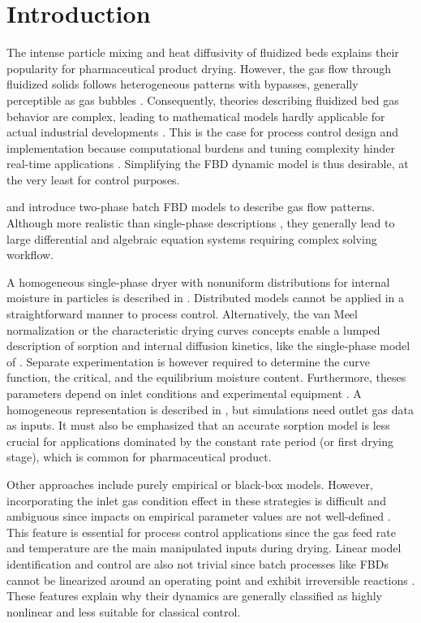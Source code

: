 \section{Introduction}

The intense particle mixing and heat diffusivity of fluidized beds explains their popularity for pharmaceutical product drying. However, the gas flow through fluidized solids follows heterogeneous patterns with bypasses, generally perceptible as gas bubbles \citep{handbookFluidization}. Consequently, theories describing fluidized bed gas behavior are complex, leading to mathematical models hardly applicable for actual industrial developments \citep{reviewModelPhilippsen}. This is the case for process control design and implementation because computational burdens and tuning complexity hinder real-time applications \citep[e.g.][]{nmpcFBD}. Simplifying the \gls{FBD} dynamic model is thus desirable, at the very least for control purposes.

\citet{batchTsotas} and \citet{fbd2phFG} introduce two-phase batch \gls{FBD} models to describe gas flow patterns. Although more realistic than single-phase descriptions \citep{flowModelCompFB}, they generally lead to large differential and algebraic equation systems requiring complex solving workflow. 

A homogeneous single-phase dryer with nonuniform distributions for internal moisture in particles is described in \citet{batchCorn}. Distributed models cannot be applied in a straightforward manner to process control. Alternatively, the van Meel normalization \citep{vanMeelModel} or the characteristic drying curves concepts \citep{handbookDrying} enable a lumped description of sorption and internal diffusion kinetics, like the single-phase model of \citet{batchGavi}. Separate experimentation is however required to determine the curve function, the critical, and the equilibrium moisture content. Furthermore, theses parameters depend on inlet conditions and experimental equipment \citep{handbookDrying}. A homogeneous representation is described in \citet{batchThermo}, but simulations need outlet gas data as inputs. It must also be emphasized that an accurate sorption model is less crucial for applications dominated by the constant rate period (or first drying stage), which is common for pharmaceutical product. 

Other approaches include purely empirical or black-box models. However, incorporating the inlet gas condition effect in these strategies is difficult and ambiguous since impacts on empirical parameter values are not well-defined \citep{handbookDrying}. This feature is essential for process control applications since the gas feed rate and temperature are the main manipulated inputs during drying. Linear model identification and control are also not trivial since batch processes like \glspl{FBD} cannot be linearized around an operating point and exhibit irreversible reactions \citep{robustNMPC}. These features explain why their dynamics are generally classified as highly nonlinear and less suitable for classical control.

